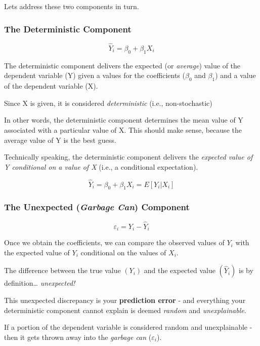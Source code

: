\documentclass[
]{book}
\begin{document}
Lets address these two components in turn.

\hypertarget{the-deterministic-component}{%
\subsubsection*{The Deterministic Component}\label{the-deterministic-component}}

\[\hat{Y}_i=\beta_0+\beta_1X_i\]

The deterministic component delivers the expected (or \emph{average}) value of the dependent variable (Y) given a values for the coefficients (\(\beta_0\) and \(\beta_1\)) and a value of the dependent variable (X).

Since X is given, it is considered \emph{deterministic} (i.e., non-stochastic)

In other words, the deterministic component determines the mean value of Y associated with a particular value of X. This should make sense, because the average value of Y is the best guess.

Technically speaking, the deterministic component delivers the \emph{expected value of Y conditional on a value of X} (i.e., a conditional expectation).

\[\hat{Y}_i=\beta_0+\beta_1X_i=E[Y_i|X_i]\]

\hypertarget{the-unexpected-garbage-can-component}{%
\subsubsection*{\texorpdfstring{The Unexpected (\emph{Garbage Can}) Component}{The Unexpected (Garbage Can) Component}}\label{the-unexpected-garbage-can-component}}

\[\varepsilon_i=Y_i-\hat{Y}_i\]

Once we obtain the coefficients, we can compare the observed values of \(Y_i\) with the expected value of \(Y_i\) conditional on the values of \(X_i\).

The difference between the true value \((Y_i)\) and the expected value \((\hat{Y}_i)\) is by definition\ldots{} \emph{unexpected!}

This unexpected discrepancy is your \textbf{prediction error} - and everything your deterministic component cannot explain is deemed \emph{random} and \emph{unexplainable}.

If a portion of the dependent variable is considered random and unexplainable - then it gets thrown away into the \emph{garbage can} (\(\varepsilon_i\)).
\end{document}
